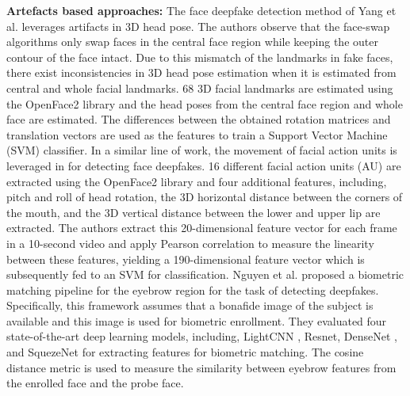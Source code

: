 \noindent\textbf{Artefacts based approaches:} The face deepfake detection method of Yang et al. \cite{yang2019exposing} leverages artifacts in 3D head pose. The authors observe that the face-swap algorithms only swap faces in the central face region while keeping the outer contour of the face intact. Due to this mismatch of the landmarks in fake faces, there exist inconsistencies in 3D head pose estimation when it is estimated from central and whole facial landmarks. 68 3D facial landmarks are estimated using the OpenFace2 \cite{baltruvsaitis2016openface} library and the head poses from the central face region and whole face are estimated. The differences between the obtained rotation matrices and translation vectors are used as the features to train a Support Vector Machine (SVM) classifier. In a similar line of work, the movement of facial action units is leveraged in \cite{agarwal2019protecting} for detecting face deepfakes. 16 different facial action units (AU) are extracted using the OpenFace2 library and four additional features, including, pitch and roll of head rotation, the 3D horizontal distance between the corners of the mouth, and the 3D vertical distance between the lower and upper lip are extracted. The authors extract this 20-dimensional feature vector for each frame in a 10-second video and apply Pearson correlation to measure the linearity between these features, yielding a 190-dimensional feature vector which is subsequently fed to an SVM for classification. Nguyen et al. \cite{nguyen2020eyebrow} proposed a biometric matching pipeline for the eyebrow region for the task of detecting deepfakes. Specifically, this framework assumes that a bonafide image of the subject is available and this image is used for biometric enrollment. They evaluated four state-of-the-art deep learning models, including, LightCNN \cite{wu2015lightened}, Resnet, DenseNet \cite{huang2017densely}, and SquezeNet for extracting features for biometric matching.  The cosine distance metric is used to measure the similarity between eyebrow features from the enrolled face and the probe face. 

